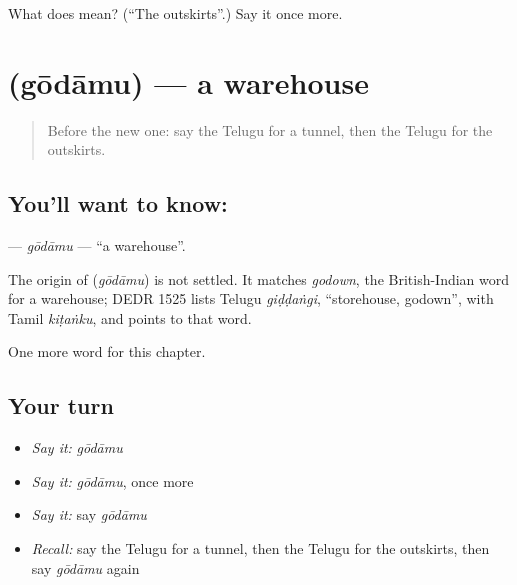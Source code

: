 \begin{tcolorbox}[breakable,colback=teal!4,colframe=teal!35!black,title={Before you move on}]
What does  mean? (\textquotedblleft{}The outskirts\textquotedblright{}.) Say it once more.
\end{tcolorbox}
\section[\texorpdfstring{\te{గోదాము} (gōdāmu)}{గోదాము (gōdāmu)}]{ (gōdāmu) — a warehouse}

\label{lesson:TE-C256-godamu}



\begin{quote}
Before the new one: say the Telugu for a tunnel, then the Telugu for the outskirts.
\end{quote}

\subsection*{You'll want to know: }
\textbf{} — \emph{gōdāmu} — \textquotedblleft{}a warehouse\textquotedblright{}.

\begin{cousinweb}
The origin of \textbf{} (\emph{gōdāmu}) is not settled. It matches \emph{godown}, the British-Indian word for a warehouse; DEDR 1525 lists Telugu \emph{giḍḍaṅgi}, \textquotedblleft{}storehouse, godown\textquotedblright{}, with Tamil \emph{kiṭaṅku}, and points to that word.
\end{cousinweb}

\begin{grammarlens}[title={What you've built}]
One more word for this chapter.
\end{grammarlens}

\subsection*{Your turn}
\begin{itemize}
\raggedright
  \item \emph{Say it:} \emph{gōdāmu}
  \item \emph{Say it:} \emph{gōdāmu}, once more
  \item \emph{Say it:} say \emph{gōdāmu}
  \item \emph{Recall:} say the Telugu for a tunnel, then the Telugu for the outskirts, then say \emph{gōdāmu} again
\end{itemize}

